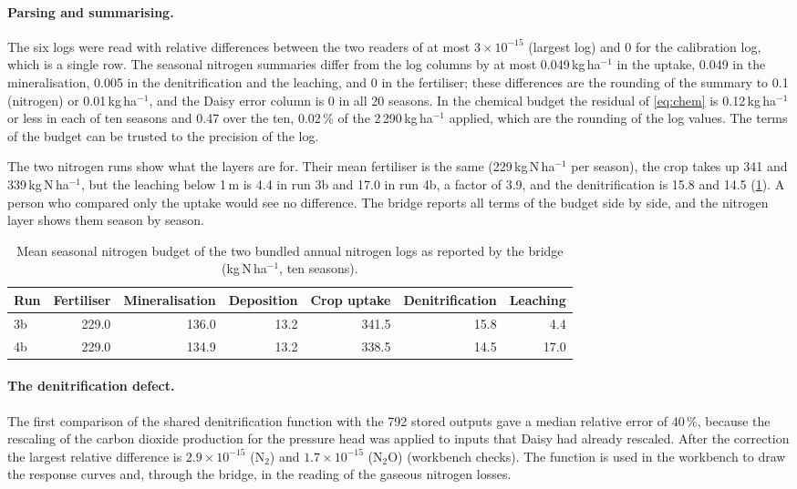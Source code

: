 \documentclass[preprint,12pt]{elsarticle}
\begin{document}
\paragraph{Parsing and summarising.}
The six logs were read with relative differences between the two readers of at most $3\times10^{-15}$ (largest log) and 0 for the calibration log, which is a single row. The seasonal nitrogen summaries differ from the log columns by at most 0.049\,kg\,ha$^{-1}$ in the uptake, 0.049 in the mineralisation, 0.005 in the denitrification and the leaching, and 0 in the fertiliser; these differences are the rounding of the summary to 0.1 (nitrogen) or 0.01\,kg\,ha$^{-1}$, and the Daisy error column is 0 in all 20 seasons. In the chemical budget the residual of \cref{eq:chem} is 0.12\,kg\,ha$^{-1}$ or less in each of ten seasons and 0.47 over the ten, 0.02\,\% of the 2\,290\,kg\,ha$^{-1}$ applied, which are the rounding of the log values. The terms of the budget can be trusted to the precision of the log.

The two nitrogen runs show what the layers are for. Their mean fertiliser is the same (229\,kg\,N\,ha$^{-1}$ per season), the crop takes up 341 and 339\,kg\,N\,ha$^{-1}$, but the leaching below 1\,m is 4.4 in run 3b and 17.0 in run 4b, a factor of 3.9, and the denitrification is 15.8 and 14.5 (\cref{tab:nrun}). A person who compared only the uptake would see no difference. The bridge reports all terms of the budget side by side, and the nitrogen layer shows them season by season.

\begin{table}[H]\centering\small
\caption{Mean seasonal nitrogen budget of the two bundled annual nitrogen logs as reported by the bridge (kg\,N\,ha$^{-1}$, ten seasons).}\label{tab:nrun}
\begin{tabular}{lrrrrrr}\toprule
Run & Fertiliser & Mineralisation & Deposition & Crop uptake & Denitrification & Leaching\\\midrule
3b & 229.0 & 136.0 & 13.2 & 341.5 & 15.8 & 4.4\\
4b & 229.0 & 134.9 & 13.2 & 338.5 & 14.5 & 17.0\\\bottomrule
\end{tabular}
\end{table}

\paragraph{The denitrification defect.}
The first comparison of the shared denitrification function with the 792 stored outputs gave a median relative error of 40\,\%, because the rescaling of the carbon dioxide production for the pressure head was applied to inputs that Daisy had already rescaled. After the correction the largest relative difference is $2.9\times10^{-15}$ (N$_2$) and $1.7\times10^{-15}$ (N$_2$O) (workbench checks). The function is used in the workbench to draw the response curves and, through the bridge, in the reading of the gaseous nitrogen losses.
\end{document}
